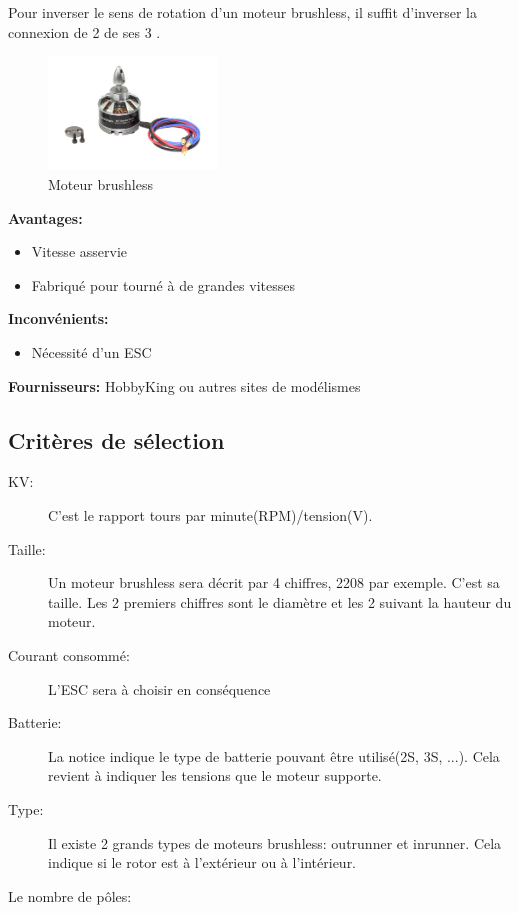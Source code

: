 \documentclass[a4paper, 11pt]{report}
\begin{document}
Pour inverser le sens de rotation d'un moteur brushless, il suffit d'inverser la connexion de 2 de ses 3 .

\begin{figure}[h!]
\begin{centering}
\includegraphics[width=0.4\textwidth]{images/MoteurBrushless.jpg}
\caption{Moteur brushless}
\par\end{centering}
\end{figure}

\textbf{Avantages:}
\begin{itemize}
\item Vitesse asservie
\item Fabriqué pour tourné à de grandes vitesses
\end{itemize}

\textbf{Inconvénients:}
\begin{itemize}
\item Nécessité d'un ESC
\end{itemize}

\textbf{Fournisseurs:} HobbyKing ou autres sites de modélismes

\subsection{Critères de sélection}
\begin{description}
\item[KV:]C'est le rapport tours par minute(RPM)/tension(V). 
\item[Taille:] Un moteur brushless sera décrit par 4 chiffres, 2208 par exemple. C'est sa taille. Les 2 premiers chiffres sont le diamètre et les 2 suivant la hauteur du moteur.
\item[Courant consommé:] L'ESC sera à choisir en conséquence
\item[Batterie:]La notice indique le type de batterie pouvant être utilisé(2S, 3S, ...). Cela revient à indiquer les tensions que le moteur supporte.
\item[Type:]Il existe 2 grands types de moteurs brushless: outrunner et inrunner. Cela indique si le rotor est à l'extérieur ou à l'intérieur.
\item[Le nombre de pôles:]
\end{description}
\end{document}
